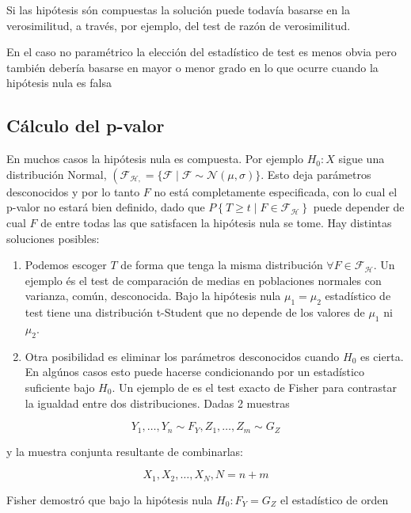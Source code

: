 \documentclass[
]{article}
\providecommand{\tightlist}{%
  \setlength{\itemsep}{0pt}\setlength{\parskip}{0pt}}
\begin{document}
Si las hipótesis són compuestas la solución puede todavía basarse en la verosimilitud, a través, por ejemplo, del test de razón de verosimilitud.

En el caso no paramétrico la elección del estadístico de test es menos obvia pero también debería basarse en mayor o menor grado en lo que ocurre cuando la hipótesis nula es falsa

\subsection{Cálculo del p-valor}\label{cuxe1lculo-del-p-valor-1}

En muchos casos la hipótesis nula es compuesta. Por ejemplo \(H_{0}: X\) sigue una distribución Normal, \(\left(\mathcal{F}_{\mathcal{H},}=\{\mathcal{F} \mid \mathcal{F} \sim \mathcal{N}(\mu, \sigma)\}\right.\). Esto deja parámetros desconocidos y por lo tanto \(F\) no está completamente especificada, con lo cual el p-valor no estará bien definido, dado que \(P\left\{T \geq t \mid F \in \mathcal{F}_{\mathcal{H}}\right\}\) puede depender de cual \(F\) de entre todas las que satisfacen la hipótesis nula se tome. Hay distintas soluciones posibles:

\begin{enumerate}
\def\labelenumi{\arabic{enumi}.}
\tightlist
\item
  Podemos escoger \(T\) de forma que tenga la misma distribución \(\forall F \in \mathcal{F}_{\mathcal{H}}\). Un ejemplo és el test de comparación de medias en poblaciones normales con varianza, común, desconocida. Bajo la hipótesis nula \(\mu_{1}= \mu_{2}\) estadístico de test tiene una distribución t-Student que no depende de los valores de \(\mu_{1}\) ni \(\mu_{2}\).
\item
  Otra posibilidad es eliminar los parámetros desconocidos cuando \(H_{0}\) es cierta. En algúnos casos esto puede hacerse condicionando por un estadístico suficiente bajo \(H_{0}\). Un ejemplo de es el test exacto de Fisher para contrastar la igualdad entre dos distribuciones. Dadas 2 muestras
\end{enumerate}

\[
Y_{1}, \ldots, Y_{n} \sim F_{Y}, Z_{1}, \ldots, Z_{m} \sim G_{Z}
\]

y la muestra conjunta resultante de combinarlas:

\[
X_{1}, X_{2}, \ldots, X_{N}, N=n+m
\]

Fisher demostró que bajo la hipótesis nula \(H_{0}: F_{Y}=G_{Z}\) el estadístico de orden
\end{document}
